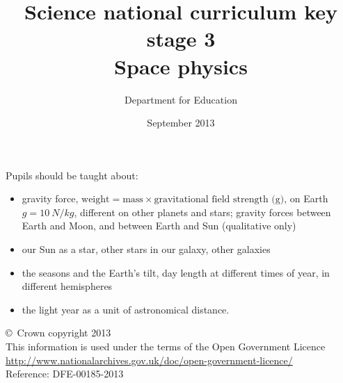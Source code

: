 \documentclass[a4paper,12pt]{article}
\begin{document}
\setcounter{secnumdepth}{0}

\title{Science national curriculum key stage 3\\Space physics}
\author{Department for Education}
\date{September 2013}
\maketitle

\thispagestyle{empty}

Pupils should be taught about:

\begin{itemize}
\item gravity force, $\text{weight} = \text{mass}\times\text{gravitational field strength (g)}$, on Earth $g=\SI{10}{N/kg}$,
different on other planets and stars; gravity forces between Earth and Moon, and
between Earth and Sun (qualitative only)
\item our Sun as a star, other stars in our galaxy, other galaxies
\item the seasons and the Earth’s tilt, day length at different times of year, in different
hemispheres
\item the light year as a unit of astronomical distance.
\end{itemize}

\vfill

\footnotesize
\noindent \copyright\ Crown copyright 2013\\
This information is used under the terms of the Open Government Licence\\
\url{http://www.nationalarchives.gov.uk/doc/open-government-licence/}\\
{\tiny Reference: DFE-00185-2013}
\end{document}
